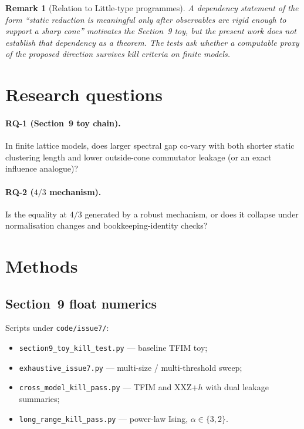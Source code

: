 \documentclass[11pt]{article}
\newtheorem{remark}{Remark}
\begin{document}
\begin{remark}[Relation to Little-type programmes]
A dependency statement of the form ``static reduction is meaningful only
after observables are rigid enough to support a sharp cone'' motivates
the Section~9 toy, but the present work does not establish that
dependency as a theorem.  The tests ask whether a computable proxy of
the proposed direction survives kill criteria on finite models.
\end{remark}

\section{Research questions}

\paragraph{RQ-1 (Section~9 toy chain).}
In finite lattice models, does larger spectral gap co-vary with both
shorter static clustering length and lower outside-cone commutator
leakage (or an exact influence analogue)?

\paragraph{RQ-2 ($4/3$ mechanism).}
Is the equality at $4/3$ generated by a robust mechanism, or does it
collapse under normalisation changes and bookkeeping-identity checks?

\section{Methods}

\subsection{Section~9 float numerics}

Scripts under \texttt{code/issue7/}:
\begin{itemize}[leftmargin=1.4em,itemsep=2pt]
  \item \nolinkurl{section9_toy_kill_test.py} --- baseline TFIM toy;
  \item \texttt{exhaustive\_issue7.py} --- multi-size / multi-threshold sweep;
  \item \nolinkurl{cross_model_kill_pass.py} --- TFIM and XXZ+$h$ with dual leakage summaries;
  \item \texttt{long\_range\_kill\_pass.py} --- power-law Ising, $\alpha\in\{3,2\}$.
\end{itemize}
\end{document}
